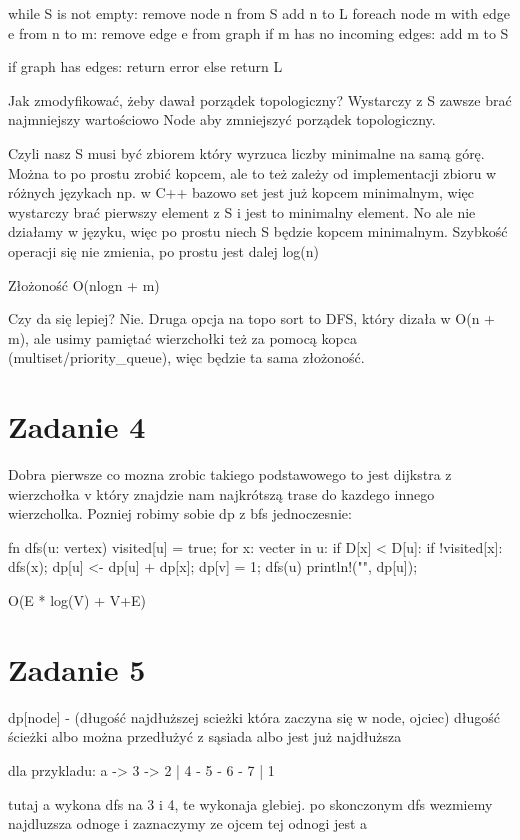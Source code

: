 \documentclass[12pt]{article}
\begin{document}
while S is not empty:
    remove node n from S
    add n to L 
    foreach node m with edge e from n to m:
        remove edge e from graph 
        if m has no incoming edges:
            add m to S 

if graph has edges:
    return error 
else 
    return L 
    

Jak zmodyfikować, żeby dawał porządek topologiczny? Wystarczy z S zawsze brać najmniejszy wartościowo Node aby zmniejszyć porządek topologiczny. 

Czyli nasz S musi być zbiorem który wyrzuca liczby minimalne na samą górę. Można to po prostu zrobić kopcem, ale to też zależy od implementacji zbioru w różnych językach np. w C++ bazowo set jest już kopcem minimalnym, więc wystarczy brać pierwszy element z S i jest to minimalny element. 
No ale nie działamy w języku, więc po prostu niech S będzie kopcem minimalnym. Szybkość operacji się nie zmienia, po prostu jest dalej log(n)

Złożoność O(nlogn + m)

Czy da się lepiej? Nie. Druga opcja na topo sort to DFS, który dizała w O(n + m), ale usimy pamiętać wierzchołki też za pomocą kopca (multiset/priority_queue), więc będzie ta sama złożoność.


\section{Zadanie 4}
Dobra pierwsze co mozna zrobic takiego podstawowego to jest dijkstra z wierzchołka v który znajdzie nam najkrótszą trase do kazdego innego wierzcholka.
Pozniej robimy sobie dp z bfs jednoczesnie:

fn dfs(u: vertex) {
    visited[u] = true;  
    for x: vecter in u:
        if D[x] < D[u]:
            if !visited[x]:
                dfs(x);
            dp[u] <- dp[u] + dp[x];
}
dp[v] = 1;
dfs(u)
println!("{}", dp[u]);

O(E * log(V) + V+E) 

\section{Zadanie 5}
dp[node] - (długość najdłuższej scieżki która zaczyna się w node, ojciec)
długość ścieżki albo można przedłużyć z sąsiada albo jest już najdłuższa

dla przykladu:
a -> 3 -> 2
|
4 - 5 - 6 - 7 
|
1

tutaj a wykona dfs na 3 i 4, te wykonaja glebiej. po skonczonym dfs wezmiemy najdluzsza odnoge i zaznaczymy ze ojcem tej odnogi jest a 
\end{document}
